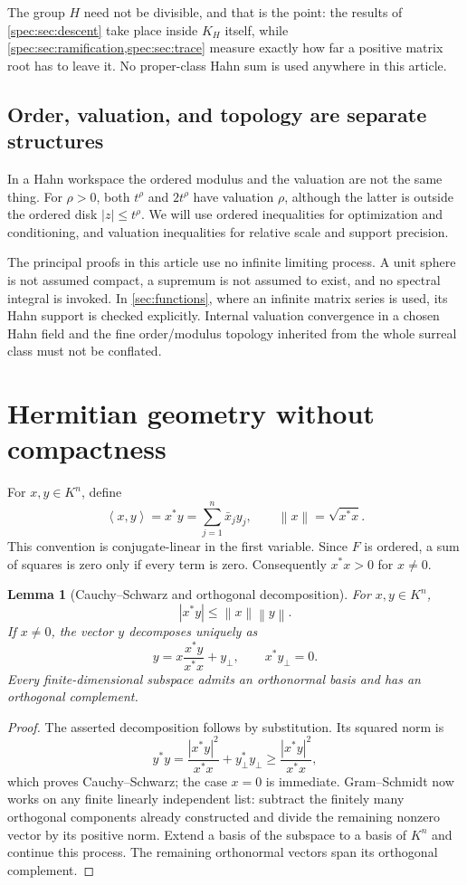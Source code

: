 \documentclass[11pt,a4paper]{article}
\numberwithin{equation}{section}
\newtheorem{lemma}[lemma]{Lemma}
\theoremstyle{definition}
\theoremstyle{remark}
\newcommand{\norm}[1]{\left\lVert#1\right\rVert}
\newcommand{\inn}[2]{\left\langle#1,#2\right\rangle}
\begin{document}
The group $H$ need not be divisible, and that is the point: the results of
\cref{spec:sec:descent} take place inside $K_H$ itself, while
\cref{spec:sec:ramification,spec:sec:trace} measure exactly how far a
positive matrix root has to leave it. No proper-class Hahn sum is used
anywhere in this article.

\subsection{Order, valuation, and topology are separate structures}
In a Hahn workspace the ordered modulus and the valuation are not the same
thing. For $\rho>0$, both $t^\rho$ and $2t^\rho$ have valuation $\rho$,
although the latter is outside the ordered disk $|z|\le t^\rho$.
We will use ordered inequalities for optimization and conditioning, and
valuation inequalities for relative scale and support precision.

The principal proofs in this article use no infinite limiting process. A
unit sphere is not assumed compact, a supremum is not assumed to exist, and
no spectral integral is invoked. In \cref{sec:functions}, where an infinite
matrix series is used, its Hahn support is checked explicitly. Internal
valuation convergence in a chosen Hahn field and the fine order/modulus
topology inherited from the whole surreal class must not be conflated.

\section{Hermitian geometry without compactness}\label{sec:geometry}

For $x,y\in K^n$, define
\[
 \inn xy=x^*y=\sum_{j=1}^n\bar x_jy_j,
 \qquad \norm x=\sqrt{x^*x}.
\]
This convention is conjugate-linear in the first variable. Since $F$ is
ordered, a sum of squares is zero only if every term is zero. Consequently
$x^*x>0$ for $x\ne0$.

\begin{lemma}[Cauchy--Schwarz and orthogonal decomposition]\label{lem:CS}
For $x,y\in K^n$,
\[
 |x^*y|\le\norm x\norm y.
\]
If $x\ne0$, the vector $y$ decomposes uniquely as
\[
 y=x\frac{x^*y}{x^*x}+y_\perp,\qquad x^*y_\perp=0.
\]
Every finite-dimensional subspace admits an orthonormal basis and has an
orthogonal complement.
\end{lemma}
\begin{proof}
The asserted decomposition follows by substitution. Its squared norm is
\[
 y^*y=\frac{|x^*y|^2}{x^*x}+y_\perp^*y_\perp
       \ge\frac{|x^*y|^2}{x^*x},
\]
which proves Cauchy--Schwarz; the case $x=0$ is immediate. Gram--Schmidt now
works on any finite linearly independent list: subtract the finitely many
orthogonal components already constructed and divide the remaining nonzero
vector by its positive norm. Extend a basis of the subspace to a basis of
$K^n$ and continue this process. The remaining orthonormal vectors span its
orthogonal complement.
\end{proof}
\end{document}
